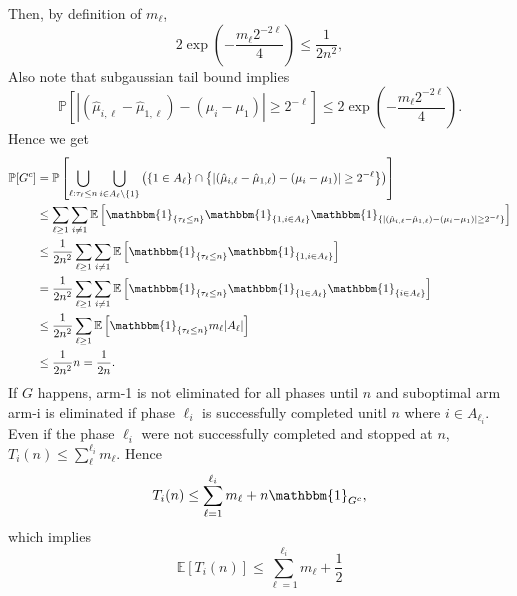 \documentclass[10pt]{article}
\theoremstyle{definition}
\newenvironment{solution*}[1]{%
  \IfBlankTF{#1}
    {\renewcommand{\themanualsolutioninner}{\unskip}}
    {\renewcommand\themanualsolutioninner{#1}}%
  \manualsolutioninner
}{\endmanualsolutioninner}
\begin{document}
\begin{solution*}{}
\begin{itemize}
        Then, by definition of $m_\ell$,
        \begin{equation*}
            2\exp \left( - \frac{m_\ell 2^{-2\ell}}{4} \right) \leq \frac{1}{2n^2},
        \end{equation*}
        Also note that subgaussian tail bound implies
        \begin{equation*}
            \mathbb{P}[ |(\hat{\mu}_{i,\ell} - \hat{\mu}_{1,\ell})-(\mu_i - \mu_1)| \geq 2^{-\ell} ] \leq  2\exp \left( - \frac{m_\ell 2^{-2\ell}}{4} \right).
        \end{equation*}
        Hence we get
        \begin{align*}
            \mathbb{P}[G^c] &= \mathbb{P} \left[ \bigcup_{\ell : \tau_\ell \leq n} \bigcup_{i\in A_\ell \setminus \{1\}} \left( \left\{ 1 \in A_\ell \right\} \cap \left\{ |(\hat{\mu}_{i,\ell} - \hat{\mu}_{1,\ell})-(\mu_i - \mu_1)| \geq 2^{-\ell} \right\}\right)\right] \\
            &\leq \sum_{\ell \geq 1} \sum_{i \neq 1} \mathbb{E} \left[ \mathbbm{1}_{\{\tau_\ell \leq n\}} \mathbbm{1}_{\{1,i \in A_\ell\}} \mathbbm{1}_{\{|(\hat{\mu}_{i,\ell} - \hat{\mu}_{1,\ell})-(\mu_i - \mu_1)| \geq 2^{-\ell}\}} \right] \\
            &\leq \frac{1}{2n^2} \sum_{\ell \geq 1} \sum_{i \neq 1} \mathbb{E} \left[ \mathbbm{1}_{\{\tau_\ell \leq n\}} \mathbbm{1}_{\{1,i \in A_\ell\}} \right] \\
            &= \frac{1}{2n^2} \sum_{\ell \geq 1} \sum_{i \neq 1} \mathbb{E} \left[ \mathbbm{1}_{\{\tau_\ell \leq n\}} \mathbbm{1}_{\{1 \in A_\ell\}} \mathbbm{1}_{\{i \in A_\ell\}} \right] \\
            &\leq \frac{1}{2n^2} \sum_{\ell \geq 1} \mathbb{E} \left[ \mathbbm{1}_{\{\tau_\ell \leq n\}} m_\ell |A_\ell| \right] \\
            &\leq \frac{1}{2n^2} n = \frac{1}{2n}.
        \end{align*}
        If $G$ happens, arm-1 is not eliminated for all phases until $n$ and suboptimal arm arm-i is eliminated if phase $\ell_i$ is successfully completed unitl $n$ where $i \in A_{\ell_i}$.
        Even if the phase $\ell_i$ were not successfully completed and stopped at $n$, $T_i (n) \leq \sum_{\ell}^{\ell_i} m_\ell$.
        Hence
        \begin{equation*}
            T_i (n) \leq \sum_{\ell=1}^{\ell_i} m_\ell + n \mathbbm{1}_{G^c},
        \end{equation*}
        which implies
        \begin{equation*}
            \mathbb{E}[T_i (n)] \leq \sum_{\ell=1}^{\ell_i}m_\ell + \frac{1}{2}
        \end{equation*}
    \end{itemize}
\end{solution*}
\end{document}
